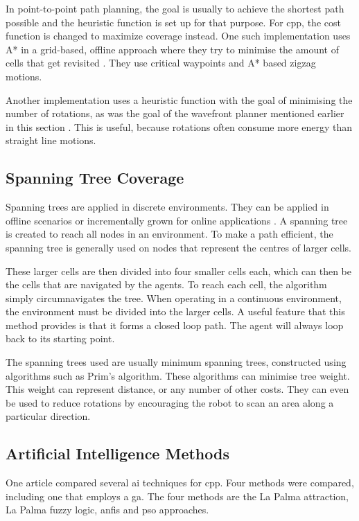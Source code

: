 In point-to-point path planning, the goal is usually to achieve the shortest path possible and the heuristic function is set up for that purpose. For \ac{cpp}, the cost function is changed to maximize coverage instead. One such implementation uses A* in a grid-based, offline approach where they try to minimise the amount of cells that get revisited \cite{Le2018}. They use critical waypoints and A* based zigzag motions. 

Another implementation uses a heuristic function with the goal of minimising the number of rotations, as was the goal of the wavefront planner mentioned earlier in this section \cite{Dogru2017}. This is useful, because rotations often consume more energy than straight line motions.
\subsection{Spanning Tree Coverage}
\label{sec: LR - sSTC}
Spanning trees are applied in discrete environments. They can be applied in offline scenarios or incrementally grown for online applications \cite{Gabriely2001}. A spanning tree is created to reach all nodes in an environment. To make a path efficient, the spanning tree is generally used on nodes that represent the centres of larger cells. 

These larger cells are then divided into four smaller cells each, which can then be the cells that are navigated by the agents. To reach each cell, the algorithm simply circumnavigates the tree. When operating in a continuous environment, the environment must be divided into the larger cells. A useful feature that this method provides is that it forms a closed loop path. The agent will always loop back to its starting point. \cite{Hazon2005} 

The spanning trees used are usually minimum spanning trees, constructed using algorithms such as Prim's algorithm. These algorithms can minimise tree weight. This weight can represent distance, or any number of other costs. They can even be used to reduce rotations by encouraging the robot to scan an area along a particular direction. \cite{Gabriely2001}

\subsection{Artificial Intelligence Methods}
\label{sec:LR - sAI}
One article compared several \ac{ai} techniques for \ac{cpp}. Four methods were compared, including one that employs a \ac{ga}. The four methods are the La Palma attraction, La Palma fuzzy logic, \ac{anfis} and \ac{pso} approaches. \cite{Juan2018}

